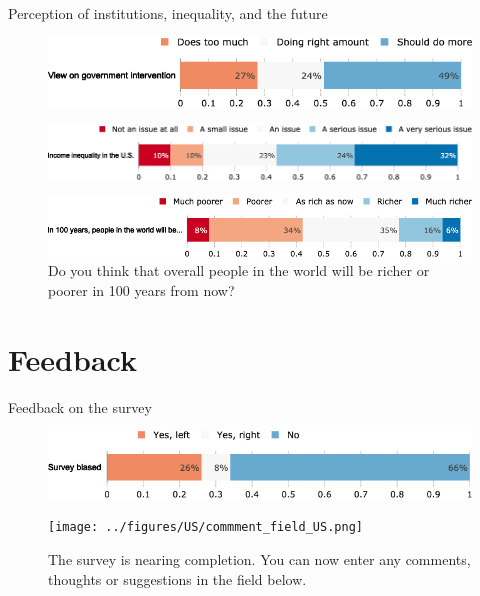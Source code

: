 \documentclass[aspectratio=169,9pt,dvipsnames]{beamer}
\begin{document}
\begin{frame}{Perception of institutions, inequality, and the future}%
\vspace{-.2cm}
\begin{figure}[h!]
\caption{Some people think the government is trying to do too many things that should be left to individuals and businesses. Others think that government should do more to solve our country's problems.
Which come closer to your own view? }
\includegraphics[width=.7\textwidth]{../figures/US/view_govt_US.png} \\
\vspace{.1cm}
\caption{How big of an issue do you think income inequality is in the U.S.?}
\includegraphics[width=.7\textwidth]{../figures/US/problem_inequality_US.png}\\
\vspace{.1cm}
\caption{Do you think that overall people in the world will be richer or poorer in 100 years from now?}
\includegraphics[width=.7\textwidth]{../figures/US/future_richness_US.png}
\end{figure}
\end{frame}


\section{Feedback}
\begin{frame}{Feedback on the survey}%
\vspace{-.2cm}
\begin{figure}[h!]
\caption{Do you feel that this survey was politically biased?}
\includegraphics[width=.6\textwidth]{../figures/US/survey_biased_US.png} \\
\vspace{.5cm}
\caption{The survey is nearing completion. You can now enter any comments, thoughts or suggestions in the field below.}
\texttt{[image: ../figures/US/commment\_field\_US.png]}
\end{figure}
\end{frame}
\end{document}
